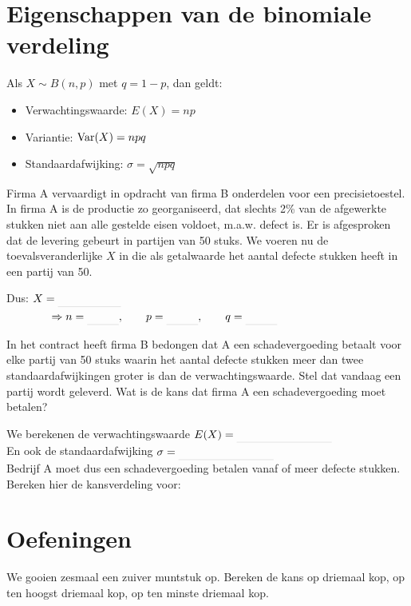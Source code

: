 \documentclass[12pt,twoside]{article}
\begin{document}
\section{Eigenschappen van de binomiale verdeling}

\begin{mdframed}
Als $X \sim B(n,p)$ met $q=1-p$, dan geldt:
\begin{itemize}
  \item Verwachtingswaarde: $E(X)=np$
  \item Variantie: $\Var(X)=npq$
  \item Standaardafwijking: $\sigma = \sqrt{npq}$
\end{itemize}
\end{mdframed}

\begin{oefening}
Firma A vervaardigt in opdracht van firma B onderdelen voor een precisietoestel. In firma A is de productie zo georganiseerd, dat slechts 2\% van de afgewerkte stukken niet aan alle gestelde eisen voldoet, m.a.w. defect is.
Er is afgesproken dat de levering gebeurt in partijen van 50 stuks. We voeren nu de toevalsveranderlijke $X$ in die als getalwaarde het aantal defecte stukken heeft in een partij van 50.

Dus: $X=\arule{2cm}$\\
$\qquad\qquad\Rightarrow  n=\arule{1cm}, \qquad p=\arule{1cm}, \qquad q=\arule{1cm}$

In het contract heeft firma B bedongen dat A een schadevergoeding betaalt voor elke partij van 50 stuks waarin het aantal defecte stukken meer dan twee standaardafwijkingen groter is dan de verwachtingswaarde. Stel dat vandaag een partij wordt geleverd. Wat is de kans dat firma A een schadevergoeding moet betalen?

We berekenen de verwachtingswaarde $E(X)=\arule{3cm}$\\
En ook de standaardafwijking $\sigma=\arule{3cm}$\\
Bedrijf A moet dus een schadevergoeding betalen vanaf \arule{1cm} of meer defecte stukken. Bereken hier de kansverdeling voor:
\end{oefening}

\section{Oefeningen}

\begin{oefening}
We gooien zesmaal een zuiver muntstuk op. Bereken de kans op driemaal kop, op ten hoogst driemaal kop, op ten minste driemaal kop.
\end{oefening}
\end{document}
